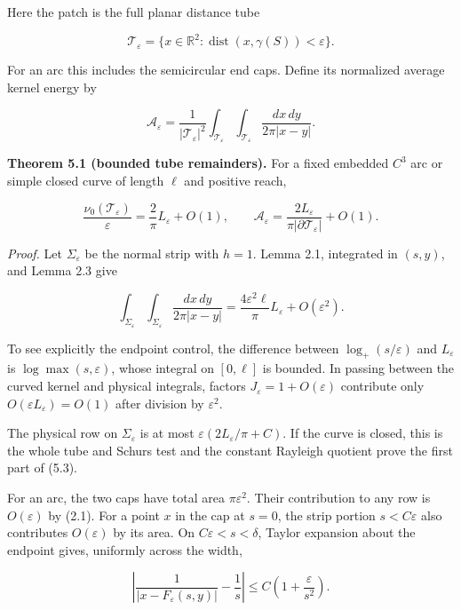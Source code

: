 \documentclass[11pt]{article}
\begin{document}
Here the patch is the full planar distance tube

\[
\mathcal T_\varepsilon=\{x\in\mathbb R^2:
                    \operatorname{dist}(x,\gamma(S))<\varepsilon\}.
\tag{5.1}
\]

For an arc this includes the semicircular end caps. Define its
normalized average kernel energy by

\[
\mathcal A_\varepsilon=\frac1{|\mathcal T_\varepsilon|^2}
 \int_{\mathcal T_\varepsilon}\int_{\mathcal T_\varepsilon}
                       \frac{dx\,dy}{2\pi|x-y|}.
\tag{5.2}
\]

\textbf{Theorem 5.1 (bounded tube remainders).} For a fixed embedded
\(C^3\) arc or simple closed curve of length \(\ell\) and positive
reach,

\[
\frac{\nu_0(\mathcal T_\varepsilon)}\varepsilon
 =\frac2\pi L_\varepsilon+O(1),
\qquad
\mathcal A_\varepsilon
 =\frac{2L_\varepsilon}{\pi|\partial\mathcal T_\varepsilon|}+O(1).
\tag{5.3}
\]

\emph{Proof.} Let \(\Sigma_\varepsilon\) be the normal strip with
\(h=1\). Lemma 2.1, integrated in \((s,y)\), and Lemma 2.3 give

\[
\int_{\Sigma_\varepsilon}\int_{\Sigma_\varepsilon}
 \frac{dx\,dy}{2\pi|x-y|}
 =\frac{4\varepsilon^2\ell}\pi L_\varepsilon+O(\varepsilon^2).
\tag{5.4}
\]

To see explicitly the endpoint control, the difference between
\(\log_+(s/\varepsilon)\) and \(L_\varepsilon\) is
\(\log\max(s,\varepsilon)\), whose integral on \([0,\ell]\) is bounded.
In passing between the curved kernel and physical integrals, factors
\(J_\varepsilon=1+O(\varepsilon)\) contribute only
\(O(\varepsilon L_\varepsilon)=O(1)\) after division by
\(\varepsilon^2\).

The physical row on \(\Sigma_\varepsilon\) is at most
\(\varepsilon(2L_\varepsilon/\pi+C)\). If the curve is closed, this is
the whole tube and Schur\textquotesingle s test and the constant
Rayleigh quotient prove the first part of (5.3).

For an arc, the two caps have total area \(\pi\varepsilon^2\). Their
contribution to any row is \(O(\varepsilon)\) by (2.1). For a point
\(x\) in the cap at \(s=0\), the strip portion \(s<C\varepsilon\) also
contributes \(O(\varepsilon)\) by its area. On
\(C\varepsilon<s<\delta\), Taylor expansion about the endpoint gives,
uniformly across the width,

\[
\left|\frac1{|x-F_\varepsilon(s,y)|}-\frac1s\right|
 \le C\left(1+\frac\varepsilon{s^2}\right).
\tag{5.5}
\]
\end{document}
